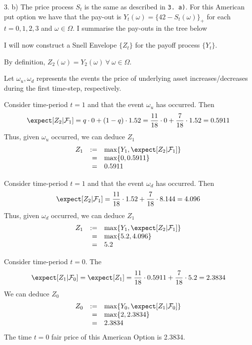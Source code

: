 \documentclass[11pt,a4paper]{article}
\begin{document}
\begin{answer}{3. b)}
  The price process $S_t$ is the same as described in \texttt{3. a)}. For this American put option we have that the pay-out is $Y_t(\omega)=\{42-S_t(\omega)\}_+$ for each $t=0,1,2,3$ and $\omega\in\Omega$. I summarise the pay-outs in the tree below
  \begin{center}
  \end{center}
  I will now construct a Snell Envelope $\{Z_t\}$ for the payoff process $\{Y_t\}$.
  \par By definition, $Z_2(\omega)=Y_2(\omega)\ \forall\ \omega\in\Omega$.
  \par Let $\omega_u,\omega_d$ represents the events the price of underlying asset increases/decreases during the first time-step, respectively.
  \par Consider time-period $t=1$ and that the event $\omega_u$ has occurred. Then
  \[ \expect[Z_2|\mathcal{F}_1]=q\cdot0+(1-q)\cdot1.52=\frac{11}{18}\cdot0+\frac7{18}\cdot1.52=0.5911 \]
  Thus, given $\omega_u$ occurred, we can deduce $Z_1$
  \[\begin{array}{rrl}
    Z_1&:=&\max\{Y_1,\expect[Z_2|\mathcal{F}_1]\}\\
    &=&\max\{0,0.5911\}\\
    &=&0.5911
  \end{array}\]
  \par Consider time-period $t=1$ and that the event $\omega_d$ has occurred. Then
  \[ \expect[Z_2|\mathcal{F}_1]=\frac{11}{18}\cdot1.52+\frac7{18}\cdot8.144=4.096 \]
  Thus, given $\omega_d$ occurred, we can deduce $Z_1$
  \[\begin{array}{rrl}
    Z_1&:=&\max\{Y_1,\expect[Z_2|\mathcal{F}_1]\}\\
    &=&\max\{5.2,4.096\}\\
    &=&5.2
  \end{array}\]
  \par Consider time-period $t=0$. The
  \[ \expect[Z_1|\mathcal{F}_0]=\expect[Z_1]=\frac{11}{18}\cdot0.5911+\frac7{18}\cdot5.2=2.3834 \]
  We can deduce $Z_0$
  \[\begin{array}{rrl}
    Z_0&:=&\max\{Y_0,\expect[Z_1|\mathcal{F}_0]\}\\
    &=&\max\{2,2.3834\}\\
    &=&2.3834
  \end{array}\]
  The time $t=0$ fair price of this American Option is 2.3834.
\end{answer}
\end{document}
